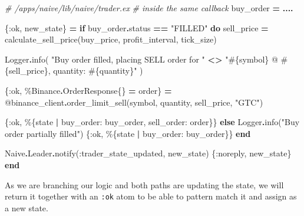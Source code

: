 \documentclass[
]{book}
\newenvironment{Shaded}{\begin{snugshade}}{\end{snugshade}}
\newcommand{\CommentTok}[1]{\textcolor[rgb]{0.56,0.35,0.01}{\textit{#1}}}
\newcommand{\ConstantTok}[1]{\textcolor[rgb]{0.00,0.00,0.00}{#1}}
\newcommand{\ControlFlowTok}[1]{\textcolor[rgb]{0.13,0.29,0.53}{\textbf{#1}}}
\newcommand{\KeywordTok}[1]{\textcolor[rgb]{0.13,0.29,0.53}{\textbf{#1}}}
\newcommand{\NormalTok}[1]{#1}
\newcommand{\OperatorTok}[1]{\textcolor[rgb]{0.81,0.36,0.00}{\textbf{#1}}}
\newcommand{\OtherTok}[1]{\textcolor[rgb]{0.56,0.35,0.01}{#1}}
\newcommand{\StringTok}[1]{\textcolor[rgb]{0.31,0.60,0.02}{#1}}
\newcommand{\VariableTok}[1]{\textcolor[rgb]{0.00,0.00,0.00}{#1}}
\begin{document}
\begin{Shaded}
\begin{Highlighting}[]
  \CommentTok{\# /apps/naive/lib/naive/trader.ex}
  \CommentTok{\# inside the same callback}
\NormalTok{  buy\_order }\OperatorTok{=} \OperatorTok{....}

\NormalTok{    \{}\VariableTok{:ok}\NormalTok{, new\_state\} }\OperatorTok{=}
      \ControlFlowTok{if}\NormalTok{ buy\_order}\OperatorTok{.}\NormalTok{status }\OperatorTok{==} \StringTok{"FILLED"} \KeywordTok{do}
\NormalTok{        sell\_price }\OperatorTok{=}\NormalTok{ calculate\_sell\_price(buy\_price, profit\_interval, tick\_size)}

        \ConstantTok{Logger}\OperatorTok{.}\NormalTok{info(}
          \StringTok{"Buy order filled, placing SELL order for "} \OperatorTok{\textless{}\textgreater{}}
            \StringTok{"}\OtherTok{\#\{}\NormalTok{symbol}\OtherTok{\}}\StringTok{ @ }\OtherTok{\#\{}\NormalTok{sell\_price}\OtherTok{\}}\StringTok{, quantity: }\OtherTok{\#\{}\NormalTok{quantity}\OtherTok{\}}\StringTok{"}
\NormalTok{        )}

\NormalTok{        \{}\VariableTok{:ok}\NormalTok{, \%}\ConstantTok{Binance}\OperatorTok{.}\ConstantTok{OrderResponse}\NormalTok{\{\} }\OperatorTok{=}\NormalTok{ order\} }\OperatorTok{=}
          \OtherTok{@binance\_client}\OperatorTok{.}\NormalTok{order\_limit\_sell(symbol, quantity, sell\_price, }\StringTok{"GTC"}\NormalTok{)}

\NormalTok{        \{}\VariableTok{:ok}\NormalTok{, \%\{state }\OperatorTok{|} \VariableTok{buy\_order:}\NormalTok{ buy\_order, }\VariableTok{sell\_order:}\NormalTok{ order\}\}}
      \ControlFlowTok{else}
        \ConstantTok{Logger}\OperatorTok{.}\NormalTok{info(}\StringTok{"Buy order partially filled"}\NormalTok{)}
\NormalTok{        \{}\VariableTok{:ok}\NormalTok{, \%\{state }\OperatorTok{|} \VariableTok{buy\_order:}\NormalTok{ buy\_order\}\}}
      \KeywordTok{end}

    \ConstantTok{Naive}\OperatorTok{.}\ConstantTok{Leader}\OperatorTok{.}\NormalTok{notify(}\VariableTok{:trader\_state\_updated}\NormalTok{, new\_state)}
\NormalTok{    \{}\VariableTok{:noreply}\NormalTok{, new\_state\}}
  \KeywordTok{end}
\end{Highlighting}
\end{Shaded}

As we are branching our logic and both paths are updating the state, we will return it together with an \texttt{:ok} atom to be able to pattern match it and assign as a new state.
\end{document}
